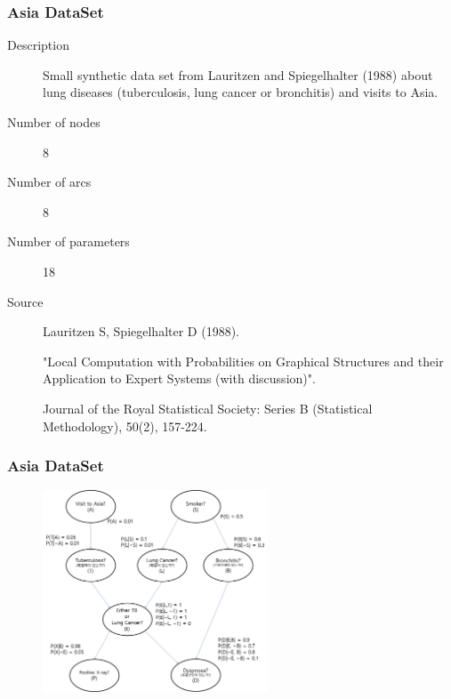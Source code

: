 \documentclass{beamer}
\begin{document}
\begin{frame}
\frametitle{Asia DataSet}
{\scriptsize{}
\begin{description}
	\item[Description] Small synthetic data set from Lauritzen and Spiegelhalter (1988) about lung diseases (tuberculosis, lung cancer or bronchitis) and visits to Asia.
	
	\item[Number of nodes] 8
	
	\item[Number of arcs] 8
	
	\item[Number of parameters] 18
	
	\item[Source] Lauritzen S, Spiegelhalter D (1988).
	
	"Local Computation with Probabilities on Graphical Structures and their Application to Expert Systems (with discussion)".
	
	Journal of the Royal Statistical Society: Series B (Statistical Methodology), 50(2), 157-224.
\end{description}
}
\end{frame}


\begin{frame}
\frametitle{Asia DataSet}
{\scriptsize{}
	\begin{figure}
		\includegraphics[height=170pt]{images/Model_Real_Asia}
	\end{figure}	
}
\end{frame}
\end{document}
